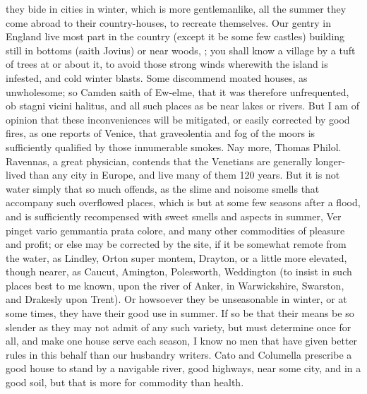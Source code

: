 {they bide in cities in winter, which is more gentlemanlike, all the
summer they come abroad to their country-houses, to recreate
themselves. Our gentry in England live most part in the country (except
it be some few castles) building still in bottoms (saith Jovius)
or near woods, ; you shall know a village by a
tuft of trees at or about it, to avoid those strong winds wherewith the
island is infested, and cold winter blasts. Some discommend moated
houses, as unwholesome; so Camden saith of Ew-elme, that it was
therefore unfrequented, ob stagni vicini halitus, and all such places
as be near lakes or rivers. But I am of opinion that these
inconveniences will be mitigated, or easily corrected by good fires, as
one reports of Venice, that graveolentia and fog of the moors is
sufficiently qualified by those innumerable smokes. Nay more,
Thomas Philol. Ravennas, a great physician, contends that the
Venetians are generally longer-lived than any city in Europe, and live
many of them 120 years. But it is not water simply that so much
offends, as the slime and noisome smells that accompany such overflowed
places, which is but at some few seasons after a flood, and is
sufficiently recompensed with sweet smells and aspects in summer, Ver
pinget vario gemmantia prata colore, and many other commodities of
pleasure and profit; or else may be corrected by the site, if it be
somewhat remote from the water, as Lindley, Orton super montem,
Drayton, or a little more elevated, though nearer, as
Caucut, Amington, Polesworth, Weddington (to
insist in such places best to me known, upon the river of Anker, in
Warwickshire,  Swarston, and Drakesly upon Trent). Or
howsoever they be unseasonable in winter, or at some times, they have
their good use in summer. If so be that their means be so slender as
they may not admit of any such variety, but must determine once for
all, and make one house serve each season, I know no men that have
given better rules in this behalf than our husbandry writers.
Cato and Columella prescribe a good house to stand by a navigable
river, good highways, near some city, and in a good soil, but that is
more for commodity than health.

}
